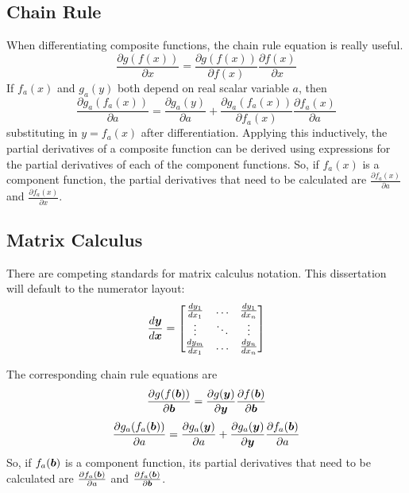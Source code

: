 \begin{appendices}
\section{Chain Rule} \label{section:Chain Rule}
When differentiating composite functions, the chain rule equation is really useful.
\begin{equation}
\frac{\partial g(f(x))}{\partial x} = \frac{\partial g(f(x))}{\partial f(x)}\frac{\partial f(x)}{\partial x}
\end{equation}
If $f_a(x)$ and $g_a(y)$ both depend on real scalar variable $a$, then
\begin{equation}
\frac{\partial g_a(f_a(x))}{\partial a} = \frac{\partial g_a(y)}{\partial a} + \frac{\partial g_a(f_a(x))}{\partial f_a(x)}\frac{\partial f_a(x)}{\partial a}
\end{equation}
substituting in $y = f_a(x)$ after differentiation.
Applying this inductively, the partial derivatives of a composite function can be derived using expressions for the partial derivatives of each of the component functions. So, if $f_a(x)$ is a component function, the partial derivatives that need to be calculated are $\frac{\partial f_a(x)}{\partial a}$ and $\frac{\partial f_a(x)}{\partial x}$.


\subsection{Matrix Calculus}
There are competing standards for matrix calculus notation. This dissertation will default to the numerator layout:
\begin{equation}
\frac{d\bm{y}}{d\bm{x}} = \begin{bmatrix}
\frac{dy_1}{dx_1} & \hdots & \frac{dy_1}{dx_n} \\ 
\vdots & \ddots & \vdots \\
\frac{dy_m}{dx_1} & \hdots & \frac{dy_n}{dx_n}
\end{bmatrix}
\end{equation}

The corresponding chain rule equations are
\begin{equation}
\frac{\partial g(f(\bm{b}))}{\partial \bm{b}} = \frac{\partial g(\bm{y})}{\partial \bm{y}}\frac{\partial f(\bm{b})}{\partial \bm{b}}
\end{equation}
\begin{equation}
\frac{\partial g_a(f_a(\bm{b}))}{\partial a} = \frac{\partial g_a(\bm{y})}{\partial a} + \frac{\partial g_a(\bm{y})}{\partial \bm{y}}\frac{\partial f_a(\bm{b})}{\partial a}
\end{equation}
So, if $f_a(\bm{b})$ is a component function, its partial derivatives that need to be calculated are $\frac{\partial f_a(\bm{b})}{\partial a}$ and $\frac{\partial f_a(\bm{b})}{\partial \bm{b}}$.


\end{appendices}
